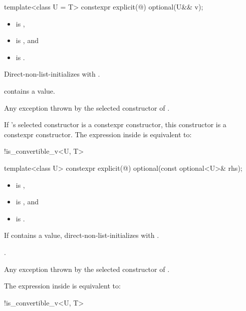%
\begin{itemdecl}
template<class U = T>
  constexpr explicit(@\seebelow@) optional(U&& v);
\end{itemdecl}

\begin{itemdescr}
\pnum
\constraints
\begin{itemize}
\item {} is ,
\item {} is , and
\item {} is .
\end{itemize}

\pnum
\effects
Direct-non-list-initializes  with .

\pnum
\ensures
{} contains a value.

\pnum
\throws
Any exception thrown by the selected constructor of .

\pnum
\remarks
If 's selected constructor is a constexpr constructor, this constructor is a constexpr constructor. The expression inside  is equivalent to:
\begin{codeblock}
!is_convertible_v<U, T>
\end{codeblock}
\end{itemdescr}

%
\begin{itemdecl}
template<class U>
  constexpr explicit(@\seebelow@) optional(const optional<U>& rhs);
\end{itemdecl}

\begin{itemdescr}
\pnum
\constraints
\begin{itemize}
\item {} is ,
\item {} is , and
\item {} is .
\end{itemize}

\pnum
\effects
If  contains a value, direct-non-list-initializes  with .

\pnum
\ensures
{}.

\pnum
\throws
Any exception thrown by the selected constructor of .

\pnum
\remarks
The expression inside  is equivalent to:
\begin{codeblock}
!is_convertible_v<U, T>
\end{codeblock}
\end{itemdescr}

